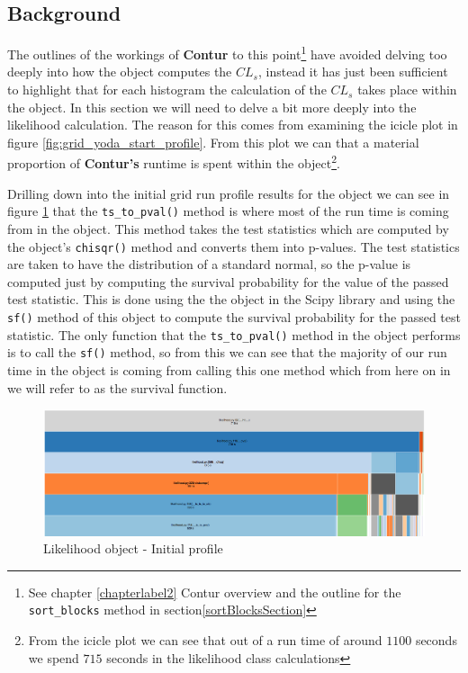 \subsection{Background}
The outlines of the workings of \textbf{Contur} to this point\footnote{See chapter \ref{chapterlabel2} Contur overview and the outline for the \texttt{sort\_blocks} method in section\ref{sortBlocksSection}} have avoided delving too deeply into how the  object computes the $CL_s$, instead it has just been sufficient to highlight that for each histogram the calculation of the $CL_s$ takes place within the  object. In this section we will need to delve a bit more deeply into the likelihood calculation. The reason for this comes from examining the icicle plot in figure \ref{fig:grid_yoda_start_profile}. From this plot we can that a material proportion of \textbf{Contur's} runtime is spent within the  object\footnote{From the icicle plot we can see that out of a run time of around $1100$ seconds we spend $715$ seconds in the likelihood class calculations}.

Drilling down into the initial grid run profile results for the  object we can see in figure \ref{fig:like_initial_profile} that the \texttt{ts\_to\_pval()} method is where most of the run time is coming from in the  object. This method takes the test statistics which are computed by the  object's \texttt{chisqr()} method and converts them into p-values. The test statistics are taken to have the distribution of a standard normal, so the p-value is computed just by computing the survival probability for the value of the passed test statistic. This is done using the the  object in the Scipy library and using the \texttt{sf()} method of this object to compute the survival probability for the passed test statistic. The only function that the \texttt{ts\_to\_pval()} method in the  object performs is to call the \texttt{sf()} method, so from this we can see that the majority of our run time in the  object is coming from calling this one method which from here on in we will refer to as the survival function.

\begin{figure}[H]
\centering
\includegraphics[scale=0.23]{plots/likelihood_drill_down.png}
\caption{Likelihood object - Initial profile}
\label{fig:like_initial_profile}
\end{figure}

